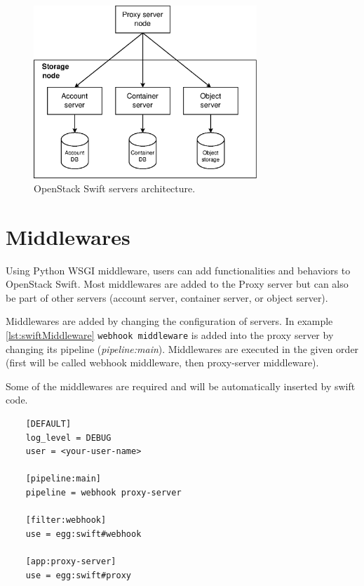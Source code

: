     \begin{figure}[H]
        \centering
        \includegraphics[width=0.75\textwidth]{obrazky-figures/swift-servers.eps}
        \caption{OpenStack Swift servers architecture.}
        \label{fig:swiftServers}
    \end{figure}

    \section{Middlewares}
    Using Python WSGI middleware, users can add functionalities and behaviors to OpenStack Swift. Most middlewares are added to the Proxy server but can also be part of other servers (account server, container server, or object server).

    Middlewares are added by changing the configuration of servers. In example \ref{lst:swiftMiddleware}
    \texttt{webhook middleware} is added into the proxy server by changing its pipeline (\textit{pipeline:main}). Middlewares are executed in the given order (first will be called webhook middleware, then proxy-server middleware).

    Some of the middlewares are required and will be automatically inserted by swift code\cite{swiftMiddleware}.

    \lstset{
        caption=Example of proxy server configuration (proxy-server.conf).,
        label=lst:swiftMiddleware
    }
    \begin{lstlisting}
    [DEFAULT]
    log_level = DEBUG
    user = <your-user-name>

    [pipeline:main]
    pipeline = webhook proxy-server

    [filter:webhook]
    use = egg:swift#webhook

    [app:proxy-server]
    use = egg:swift#proxy
    \end{lstlisting}

